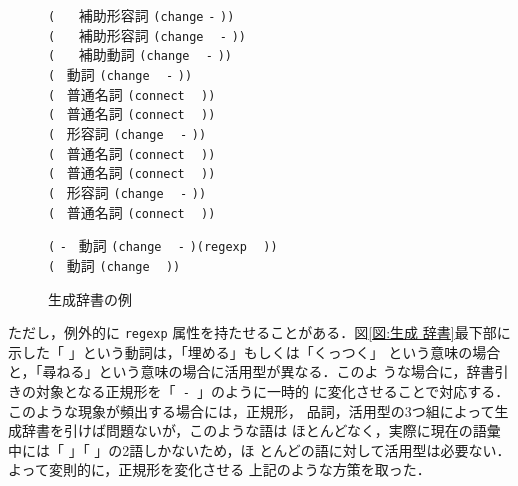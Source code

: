 \begin{figure}
\begin{boxit}

\noindent
\verb|(|
\verb*| |
\ 補助形容詞 
\verb|(change| 
\verb|-|
\verb|))|
\\
\verb|(|
\verb*| |
\ 補助形容詞 
\verb|(change|
\ 
\verb|-|
\verb|))|
\\
\verb|(|
\verb*| |
\ 補助動詞 
\verb|(change|
\ 
\verb|-|
\verb|))|
\\
\verb|(|
\ 動詞 
\verb|(change|
\ 
\verb|-|
\verb|))|
\\
\verb|(|
\ 普通名詞 
\verb|(connect|
\ 
\verb|))|
\\
\verb|(|
\ 普通名詞 
\verb|(connect|
\ 
\verb|))|
\\
\verb|(|
\ 形容詞 
\verb|(change|
\ 
\verb|-|
\verb|))|
\\
\verb|(|
\ 普通名詞 
\verb|(connect|
\ 
\verb|))|
\\
\verb|(|
\ 普通名詞 
\verb|(connect|
\ 
\verb|))|
\\
\verb|(|
\ 形容詞 
\verb|(change|
\ 
\verb|-|
\verb|))|
\\
\verb|(|
\ 普通名詞 
\verb|(connect|
\ 
\verb|))|
\vspace{0.8\baselineskip}

\noindent
\verb|(|
\verb|-|
\ 動詞 
\verb|(change|
\ 
\verb|-|
\verb|)(regexp|
\ 
\verb|))|
\\
\verb|(|
\ 動詞 
\verb|(change|
\ 
\verb|))|
\end{boxit}
\caption{生成辞書の例}
\label{図:生成辞書}
\end{figure}

ただし，例外的に {\tt regexp} 属性を持たせることがある．図\ref{図:生成
  辞書}最下部に示した「
」という動詞は，「埋める」もしくは「くっつく」
という意味の場合と，「尋ねる」という意味の場合に活用型が異なる．このよ
うな場合に，辞書引きの対象となる正規形を「{\tt {}
-
}」のように一時的
に変化させることで対応する．このような現象が頻出する場合には，正規形，
品詞，活用型の3つ組によって生成辞書を引けば問題ないが，このような語は
ほとんどなく，実際に現在の語彙中には「
」「
」の2語しかないため，ほ
とんどの語に対して活用型は必要ない．よって変則的に，正規形を変化させる
上記のような方策を取った．

